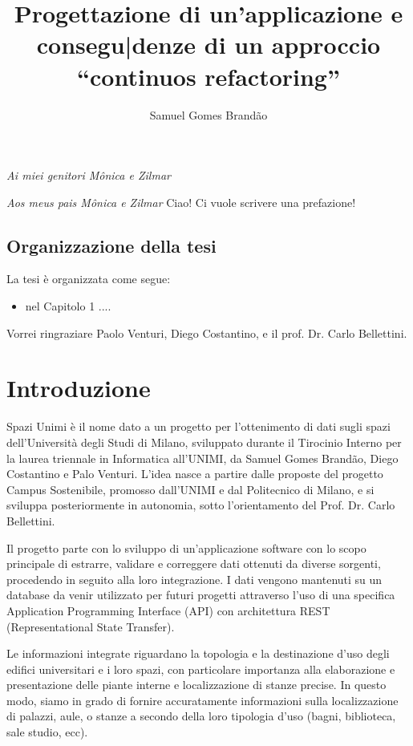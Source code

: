\documentclass[12pt]{report}
\begin{document}
\title{Progettazione di un'applicazione e consegu|denze di un approccio ``continuos refactoring''}
\author{Samuel Gomes Brandão}

\beforepreface
{}
        {\hfill \Large {\sl Ai miei genitori Mônica e Zilmar}}

        {\hfill \Large {\sl Aos meus pais Mônica e Zilmar}}
% 
%
Ciao! Ci vuole scrivere una prefazione!
%
%
\section*{Organizzazione della tesi}
\label{organizzazione}
La tesi \`e organizzata come segue:
\begin{itemize}
\item nel Capitolo 1 ....
\end{itemize}
%
%
Vorrei ringraziare Paolo Venturi, Diego Costantino, 
e il prof. Dr. Carlo Bellettini. 
\afterpreface


% 
% 
\chapter{Introduzione}
\label{cap1}

Spazi Unimi è il nome dato a un progetto per l'ottenimento di dati sugli spazi dell’Università degli Studi di Milano, sviluppato durante il Tirocinio Interno per la laurea triennale in Informatica all’UNIMI, da Samuel Gomes Brandão, Diego Costantino e Palo Venturi. L'idea nasce a partire dalle proposte del progetto Campus Sostenibile, promosso dall’UNIMI e dal Politecnico di Milano, e si sviluppa posteriormente in autonomia, sotto l'orientamento del Prof. Dr. Carlo Bellettini.

Il progetto parte con lo sviluppo di un'applicazione software con lo scopo principale di estrarre, validare e correggere dati ottenuti da diverse sorgenti, procedendo in seguito alla loro integrazione. I dati vengono mantenuti su un database da venir utilizzato per futuri progetti attraverso l'uso di una specifica Application Programming Interface (API) con architettura REST (Representational State Transfer). 

Le informazioni integrate riguardano la topologia e la destinazione d'uso degli edifici universitari e i loro spazi, con particolare importanza alla elaborazione e presentazione delle piante interne e localizzazione di stanze precise. In questo modo, siamo in grado di fornire accuratamente informazioni sulla localizzazione di palazzi, aule, o stanze a secondo della loro tipologia d'uso (bagni, biblioteca, sale studio, ecc).
\end{document}
